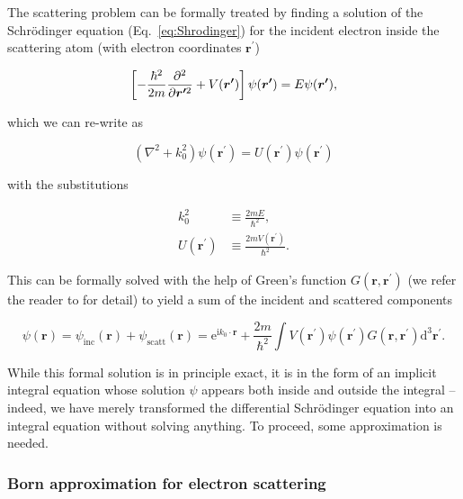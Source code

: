 \documentclass[%
 superscriptaddress,
 aip,
 amsmath,amssymb,
preprint,%
 author-year,%
longbibliography
]{revtex4-2}
\begin{document}
The scattering problem can be formally treated by finding a solution of the Schrödinger equation (Eq.~\ref{eq:Shrodinger}) for the incident electron inside the scattering atom (with electron coordinates $\bm{r^{\prime}}$)

\begin{equation}
    \left[-\frac{\hbar^{2}}{2 m} \frac{\partial^{2}}{\partial \bm{r^{\prime \textmd{2}}}}+V(\bm{r^{\prime}})\right] \psi(\bm{r^{\prime}}) = E\psi(\bm{r^{\prime}}),
\end{equation}

which we can re-write as

\begin{equation}
    \left(\nabla^{2}+k_{0}^{2}\right) \psi\left(\bm{r}^{\prime}\right)=U\left(\bm{r}^{\prime}\right) \psi\left(\bm{r}^{\prime}\right)
\end{equation}

with the substitutions 

\begin{equation}
\begin{aligned} 
    k_{0}^{2} & \equiv \frac{2 m E}{\hbar^{2}}, \\ U\left(\bm{r}^{\prime}\right) & \equiv \frac{2 m V\left(\bm{r}^{\prime}\right)}{\hbar^{2}}.
\end{aligned}
\end{equation}

This can be formally solved with the help of Green's function $G(\bm{r},\bm{r^{\prime}})$ (we refer the reader to \cite{fultz_transmission_2013} for detail) to yield a sum of the incident and scattered components

\begin{equation}
    \psi(\bm{r}) = \psi_{\mathrm{inc}}(\bm{r}) + \psi_{\mathrm{scatt}}(\bm{r}) =
    \mathrm{e}^{\mathrm{i} k_{0} \cdot \bm{r}}+\frac{2 m}{\hbar^{2}} \int V\left(\bm{r}^{\prime}\right) \psi\left(\bm{r}^{\prime}\right) G\left(\bm{r}, \bm{r}^{\prime}\right) \mathrm{d}^{3} \bm{r}^{\prime}.
\label{eq:scattering_schrödinger}
\end{equation}

While this formal solution is in principle exact, it is in the form of an implicit integral equation whose solution $\psi$ appears both inside and outside the integral -- indeed, we have merely transformed the differential Schrödinger equation into an integral equation without solving anything. To proceed, some approximation is needed.

\subsubsection*{Born approximation for electron scattering}
\end{document}
